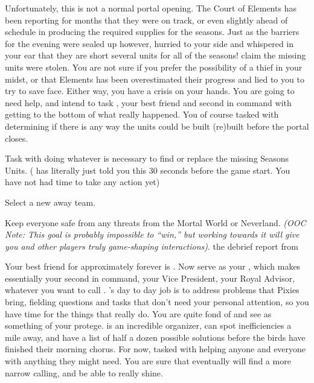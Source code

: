 \documentclass[char]{PP}
\begin{document}
Unfortunately, this is not a normal portal opening. The Court of Elements has been reporting for months that they were on track, or even slightly ahead of schedule in producing the required supplies for the seasons. Just as the barriers for the evening were sealed up however, \cEHead{} hurried to your side and whispered in your ear that they are short several units for all of the seasons! \cEHead{\They} claim\cEHead{\plural} the missing units were stolen. You are not sure if you prefer the possibility of a thief in your midst, or that Elements has been overestimated their progress and lied to you to try to save face. Either way, you have a crisis on your hands. You are going to need help, and intend to task \cSAdvisor{}, your best friend and second in command with getting to the bottom of what really happened. You of course tasked \cEHead{} with determining if there is any way the units could be built (re)built before the portal closes.

\begin{itemz}
	\item Task \cSAdvisor{} with doing whatever is necessary to find or replace the missing Seasons Units. (\cEHead{} has literally just told you this 30 seconds before the game start. You have not had time to take any action yet)
	\item Select a new away team.
	\item Keep everyone safe from any threats from the Mortal World or Neverland. \textit{(OOC Note: This goal is probably impossible to ``win,'' but working towards it will give you and other players truly game-shaping interactions)}.
	\itemReceive the debrief report from \cSPM{}
\end{itemz}

\begin{itemz}[Notes]
	\item 
\end{itemz}

\begin{contacts}
	\contact{\cSAdvisor{}} Your best friend for approximately forever is \cSAdvisor{}. Now \cSAdvisor{\They} serve\cSAdvisor{\plural} as your \cSAdvisor{\Prince}, which makes \cSAdvisor{\them} essentially your second in command, your Vice President, your Royal Advisor, whatever you want to call \cSAdvisor{\them}. \cSAdvisor{}'s day to day job is to address problems that Pixies bring, fielding questions and tasks that don't need your personal attention, so you have time for the things that really do.
	\contact{\cSHelp{}} You are quite fond of \cSHelp{} and see \cSHelp{\them} as something of your protege. \cSHelp{} is an incredible organizer, can spot inefficiencies a mile away, and have a list of half a dozen possible solutions before the birds have finished their morning chorus. For now, \cSHelp{\Theyare} tasked with helping anyone and everyone with anything they might need. You are sure that eventually \cSHelp{} will find a more narrow calling, and be able to really shine.
\end{contacts}
\end{document}
